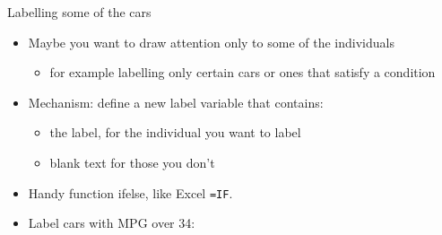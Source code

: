 \documentclass[
  ignorenonframetext,
]{beamer}
\newenvironment{Shaded}{\begin{snugshade}}{\end{snugshade}}
\newcommand{\DataTypeTok}[1]{\textcolor[rgb]{0.13,0.29,0.53}{#1}}
\newcommand{\DecValTok}[1]{\textcolor[rgb]{0.00,0.00,0.81}{#1}}
\newcommand{\KeywordTok}[1]{\textcolor[rgb]{0.13,0.29,0.53}{\textbf{#1}}}
\newcommand{\NormalTok}[1]{#1}
\newcommand{\OperatorTok}[1]{\textcolor[rgb]{0.81,0.36,0.00}{\textbf{#1}}}
\newcommand{\StringTok}[1]{\textcolor[rgb]{0.31,0.60,0.02}{#1}}
\providecommand{\tightlist}{%
  \setlength{\itemsep}{0pt}\setlength{\parskip}{0pt}}
\begin{document}
\begin{frame}[fragile]{Labelling some of the cars}
\protect\hypertarget{labelling-some-of-the-cars}{}

\begin{itemize}
\tightlist
\item
  Maybe you want to draw attention only to some of the individuals

  \begin{itemize}
  \tightlist
  \item
    for example labelling only certain cars or ones that satisfy a
    condition
  \end{itemize}
\item
  Mechanism: define a new label variable that contains:

  \begin{itemize}
  \tightlist
  \item
    the label, for the individual you want to label
  \item
    blank text for those you don't
  \end{itemize}
\item
  Handy function ifelse, like Excel \texttt{=IF}.
\item
  Label cars with MPG over 34:
\end{itemize}

\begin{Shaded}
\end{Shaded}

\end{frame}
\end{document}
